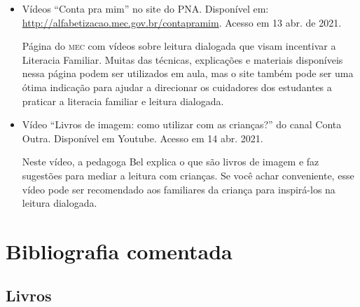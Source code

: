 \documentclass[11pt]{extarticle}
\begin{document}
\begin{itemize}
\item Vídeos “Conta pra mim” no site do PNA. Disponível em: \url{http://alfabetizacao.mec.gov.br/contapramim}. 
Acesso em 13 abr. de 2021.

Página do \textsc{mec} com vídeos sobre leitura dialogada que visam incentivar a Literacia Familiar. Muitas das 
técnicas, explicações e materiais disponíveis nessa página podem ser utilizados em aula, mas o site também 
pode ser uma ótima indicação para ajudar a direcionar os cuidadores dos estudantes a praticar 
a literacia familiar e leitura dialogada.

\item Vídeo “Livros de imagem: como utilizar com as crianças?” do canal Conta Outra. Disponível em Youtube. 
Acesso em 14 abr. 2021. 

Neste vídeo, a pedagoga Bel explica o que são livros de imagem e faz sugestões para mediar a leitura com 
crianças. Se você achar conveniente, esse vídeo pode ser recomendado aos familiares da criança 
para inspirá-los na leitura dialogada. 
\end{itemize}

\section{Bibliografia comentada}

\subsection{Livros}
\end{document}
